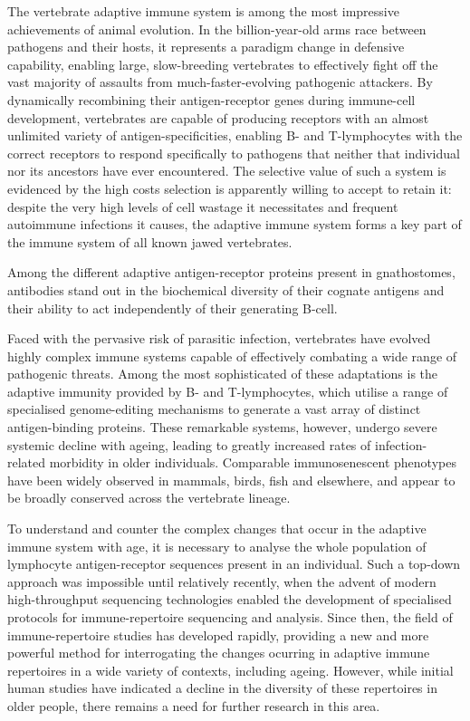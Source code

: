 The vertebrate adaptive immune system is among the most impressive achievements of animal evolution. In the billion-year-old arms race between pathogens and their hosts, it represents a paradigm change in defensive capability, enabling large, slow-breeding vertebrates to effectively fight off the vast majority of assaults from much-faster-evolving pathogenic attackers. By dynamically recombining their antigen-receptor genes during immune-cell development, vertebrates are capable of producing receptors with an almost unlimited variety of antigen-specificities, enabling B- and T-lymphocytes with the correct receptors to respond specifically to pathogens that neither that individual nor its ancestors have ever encountered. The selective value of such a system is evidenced by the high costs selection is apparently willing to accept to retain it: despite the very high levels of cell wastage it necessitates and frequent autoimmune infections it causes, the adaptive immune system forms a key part of the immune system of all known jawed vertebrates.

Among the different adaptive antigen-receptor proteins present in gnathostomes, antibodies stand out in the biochemical diversity of their cognate antigens and their ability to act independently of their generating B-cell.


Faced with the pervasive risk of parasitic infection, vertebrates have evolved highly complex immune systems capable of effectively combating a wide range of pathogenic threats. Among the most sophisticated of these adaptations is the adaptive immunity provided by B- and T-lymphocytes, which utilise a range of specialised genome-editing mechanisms to generate a vast array of distinct antigen-binding proteins. These remarkable systems, however, undergo severe systemic decline with ageing, leading to greatly increased rates of infection-related morbidity in older individuals. Comparable immunosenescent phenotypes have been widely observed in mammals, birds, fish and elsewhere, and appear to be broadly conserved across the vertebrate lineage.

To understand and counter the complex changes that occur in the adaptive immune system with age, it is necessary to analyse the whole population of lymphocyte antigen-receptor sequences present in an individual. Such a top-down approach was impossible until relatively recently, when the advent of modern high-throughput sequencing technologies enabled the development of specialised protocols for immune-repertoire sequencing and analysis. Since then, the field of immune-repertoire studies has developed rapidly, providing a new and more powerful method for interrogating the changes ocurring in adaptive immune repertoires in a wide variety of contexts, including ageing. However, while initial human studies have indicated a decline in the diversity of these repertoires in older people, there remains a need for further research in this area. %

